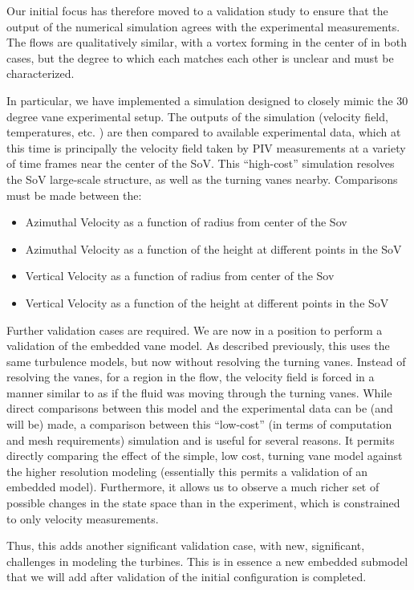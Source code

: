 %
%
%

Our initial focus has therefore moved to a validation study to ensure that the
output of the numerical simulation agrees with the experimental
measurements. The flows are qualitatively similar, with a vortex forming
in the center of in both cases, but the degree to which each matches
each other is unclear and must be characterized. 

In particular, we have implemented a simulation designed
to closely mimic the 30 degree vane experimental setup. The outputs of
the simulation (velocity field, temperatures, etc. ) are then compared
to available experimental data, which at this time is principally the
velocity field taken by PIV measurements at a variety of time frames
near the center of the SoV. This ``high-cost'' simulation resolves
the SoV large-scale structure, as well as the turning vanes
nearby. Comparisons must be made between the:
\begin{itemize}
 \item Azimuthal Velocity as a function of radius from center of the Sov
 \item Azimuthal Velocity as a function of the height at different
       points in the SoV
 \item Vertical Velocity as a function of radius from center of the Sov
 \item Vertical Velocity as a function of the height at different
       points in the SoV
\end{itemize}

%
%
Further validation cases are required. We are now in a position to perform
a validation of the embedded vane model. As described previously, this
uses the same turbulence models, but now without resolving the turning
vanes. Instead of resolving the vanes, for a region in the flow, the
velocity field is forced in a manner similar to as if the fluid was
moving through the turning vanes. While direct comparisons between this
model and the experimental data can be (and will be) made, a comparison between this
``low-cost'' (in terms of computation and mesh requirements) simulation
and is useful for several reasons. It permits directly comparing the effect of
the simple, low cost, turning vane model against the higher resolution
modeling (essentially this permits a validation of an embedded
model). Furthermore, it allows us to observe a much richer set of
possible changes in the state space than in the experiment, which is
constrained to only velocity measurements. 


%
%
%


%
%
Thus, this adds another significant validation case, with new, significant,
challenges in modeling the turbines. This is in essence a new embedded
submodel that we will add after validation of the initial configuration
is completed. 
